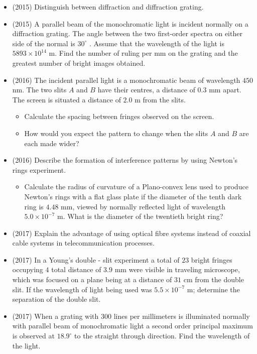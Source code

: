 \documentclass{article}
\begin{document}
\begin{itemize}
\item (2015)  Distinguish between diffraction and diffraction grating.
\item (2015)  A parallel beam of the monochromatic light is incident normally on a diffraction grating.  The angle between the two first-order spectra on either side of the normal is $ 30^{\circ}$ .  Assume that the wavelength of the light is $ 5893\times 10^{14}$ m. Find the number of ruling per mm on the grating and the greatest number of bright images obtained. 
\item (2016)  The incident parallel light is a monochromatic beam of wavelength $ 450$ nm.  The two slits $ A$ and $ B$ have their centres, a distance of $ 0.3$ mm apart.  The screen is situated a distance of $ 2.0$ m from the slits.
 \begin{itemize}
\item Calculate the spacing between fringes observed on the screen.
\item How would you expect the pattern to change when the slits $ A$ and $ B$ are each made wider?
\end{itemize}
\item (2016)  Describe the formation of interference patterns by using Newton’s rings experiment.
 \begin{itemize}
\item Calculate the radius of curvature of a Plano-convex lens used to produce Newton’s rings with a flat glass plate if the diameter of the tenth dark ring is $ 4.48$ mm, viewed by normally reflected light of wavelength $ 5.0 \times 10^{-7}$ m.  What is the diameter of the twentieth bright ring?
\end{itemize}
\item (2017)  Explain the advantage of using optical fibre systems instead of coaxial cable systems in telecommunication processes.
\item (2017)  In a Young's double - slit experiment a total of $ 23$ bright fringes occupying $ 4$ total distance of $ 3.9$ mm were visible in traveling microscope, which was focused on a plane being at a distance of $ 31$ cm from the double slit. If the wavelength of light being used was $ 5.5 \times 10^{-7}$ m; determine the separation of the double slit.
\item (2017)  When a grating with $ 300$ lines per millimeters is illuminated normally with parallel beam of monochromatic light a second order principal maximum is observed at $ 18.9^{\circ}$ to the straight through direction. Find the wavelength of the light.

\end{itemize}
\end{document}
